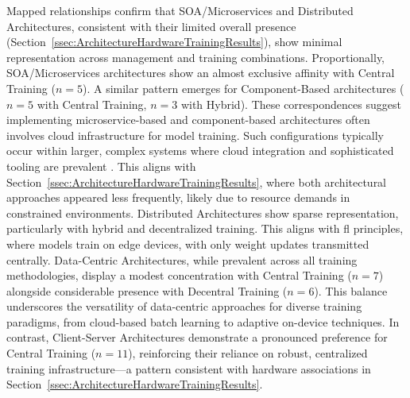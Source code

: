 Mapped relationships confirm that SOA/Microservices and Distributed Architectures, consistent with their limited overall presence (Section~\ref{ssec:ArchitectureHardwareTrainingResults}), show minimal representation across management and training combinations. Proportionally, SOA/Microservices architectures show an almost exclusive affinity with Central Training ($n=5$). A similar pattern emerges for Component-Based architectures ($n=5$ with Central Training, $n=3$ with Hybrid). These correspondences suggest implementing microservice-based and component-based architectures often involves cloud infrastructure for model training. Such configurations typically occur within larger, complex systems where cloud integration and sophisticated tooling are prevalent \cite{fraidlingTinyMachineLearning2023}. This aligns with Section~\ref{ssec:ArchitectureHardwareTrainingResults}, where both architectural approaches appeared less frequently, likely due to resource demands in constrained environments.
Distributed Architectures show sparse representation, particularly with hybrid and decentralized training. This aligns with \gls{fl} principles, where models train on edge devices, with only weight updates transmitted centrally.
Data-Centric Architectures, while prevalent across all training methodologies, display a modest concentration with Central Training ($n=7$) alongside considerable presence with Decentral Training ($n=6$). This balance underscores the versatility of data-centric approaches for diverse training paradigms, from cloud-based batch learning to adaptive on-device techniques.
In contrast, Client-Server Architectures demonstrate a pronounced preference for Central Training ($n=11$), reinforcing their reliance on robust, centralized training infrastructure—a pattern consistent with hardware associations in Section~\ref{ssec:ArchitectureHardwareTrainingResults}.

